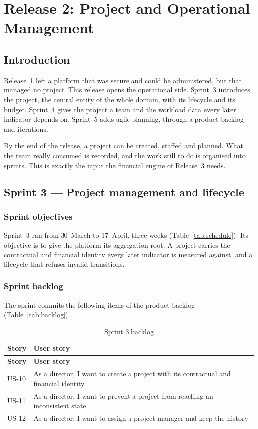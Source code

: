 \chapter{Release 2: Project and Operational Management}

\section*{Introduction}
Release~1 left a platform that was secure and could be administered, but that managed no project.
This release opens the operational side. Sprint~3 introduces the project, the central entity of
the whole domain, with its lifecycle and its budget. Sprint~4 gives the project a team and the
workload data every later indicator depends on. Sprint~5 adds agile planning, through a product
backlog and iterations.

By the end of the release, a project can be created, staffed and planned. What the team really
consumed is recorded, and the work still to do is organised into sprints. This is exactly the
input the financial engine of Release~3 needs.
\section{Sprint 3 --- Project management and lifecycle}

\subsection{Sprint objectives}
Sprint~3 ran from 30~March to 17~April, three weeks (Table~\ref{tab:schedule}). Its objective is
to give the platform its aggregation root. A project carries the contractual and financial
identity every later indicator is measured against, and a lifecycle that refuses invalid
transitions.

\subsection{Sprint backlog}
The sprint commits the following items of the product backlog (Table~\ref{tab:backlog}).

\begin{longtable}{|m{1.6cm}|m{12.4cm}|}
\caption{Sprint 3 backlog}\label{tab:sb3}\\
\hline
\textbf{Story} & \textbf{User story} \\
\hline
\endfirsthead
\hline
\textbf{Story} & \textbf{User story} \\
\hline
\endhead
\endfoot
\endlastfoot
\hline
US-10 & As a director, I want to create a project with its contractual and financial identity \\
\hline
US-11 & As a director, I want to prevent a project from reaching an inconsistent state \\
\hline
US-12 & As a director, I want to assign a project manager and keep the history \\
\hline
\end{longtable}

